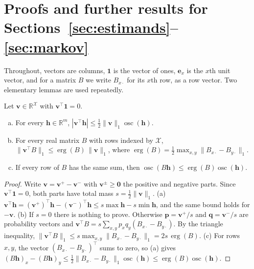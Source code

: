 \providecommand{\osc}{\operatorname{osc}}
\providecommand{\dTV}{d_{\mathrm{TV}}}

\section{Proofs and further results for Sections~\ref{sec:estimands}--\ref{sec:markov}}\label{app:proofs-estimands}

Throughout, vectors are columns, $\bm1$ is the vector of ones, $\bm e_x$ is the $x$th unit vector, and for a matrix $B$ we write $B_{x\cdot}$ for its $x$th row, as a row vector. Two elementary lemmas are used repeatedly.

\begin{lemma}\label{lem:app-zerosum}
Let $\bm v\in\mathbb R^{\mathcal X}$ with $\bm v^{\top}\bm1=0$.
\begin{enumerate}[(a)]
  \item For every $\bm h\in\mathbb R^m$, $|\bm v^{\top}\bm h|\le\frac12\|\bm v\|_1\osc(\bm h)$.
  \item For every real matrix $B$ with rows indexed by $\mathcal X$, $\|\bm v^{\top}B\|_1\le\operatorname{erg}(B)\,\|\bm v\|_1$, where $\operatorname{erg}(B)=\frac12\max_{x,y}\|B_{x\cdot}-B_{y\cdot}\|_1$.
  \item If every row of $B$ has the same sum, then $\osc(B\bm h)\le\operatorname{erg}(B)\osc(\bm h)$.
\end{enumerate}
\end{lemma}

\begin{proof}
Write $\bm v=\bm v^+-\bm v^-$ with $\bm v^\pm\ge\bm0$ the positive and negative parts. Since $\bm v^{\top}\bm1=0$, both parts have total mass $s=\frac12\|\bm v\|_1$.
(a) $\bm v^{\top}\bm h=(\bm v^+)^{\top}\bm h-(\bm v^-)^{\top}\bm h\le s\max\bm h-s\min\bm h$, and the same bound holds for $-\bm v$.
(b) If $s=0$ there is nothing to prove. Otherwise $\bm p=\bm v^+/s$ and $\bm q=\bm v^-/s$ are probability vectors and $\bm v^{\top}B=s\sum_{x,y}p_xq_y(B_{x\cdot}-B_{y\cdot})$. By the triangle inequality, $\|\bm v^{\top}B\|_1\le s\max_{x,y}\|B_{x\cdot}-B_{y\cdot}\|_1=2s\,\operatorname{erg}(B)$.
(c) For rows $x,y$, the vector $(B_{x\cdot}-B_{y\cdot})^{\top}$ sums to zero, so (a) gives $(B\bm h)_x-(B\bm h)_y\le\frac12\|B_{x\cdot}-B_{y\cdot}\|_1\osc(\bm h)\le\operatorname{erg}(B)\osc(\bm h)$.
\end{proof}

